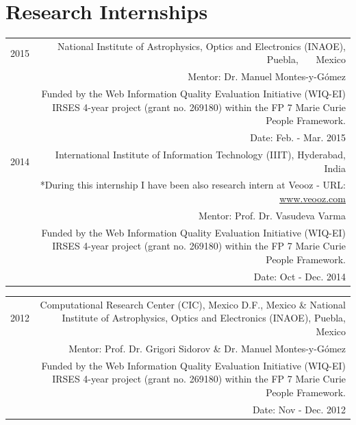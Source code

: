 \documentclass[10pt]{article}
\begin{document}
\section*{Research Internships}
\begin{tabular}{L!{\VRule}R}
	2015&National Institute of Astrophysics, Optics and Electronics (INAOE), Puebla, ~~~Mexico\\
	&\scriptsize{Mentor: Dr. Manuel Montes-y-G{\'o}mez}\\          
	&\scriptsize{Funded by the  Web Information Quality Evaluation Initiative (WIQ-EI) IRSES 4-year project (grant no. 269180) within the FP 7 Marie Curie People Framework.}\\
	&\scriptsize{Date: Feb. - Mar. 2015}\vspace{5pt}\\
	2014&International Institute of Information Technology (IIIT), Hyderabad, India\\
	&\scriptsize{*During this internship I have been also research intern at Veooz - URL: \url{www.veooz.com} }\\
	&\scriptsize{Mentor: Prof. Dr. Vasudeva Varma}\\          
	&\scriptsize{Funded by the  Web Information Quality Evaluation Initiative (WIQ-EI) IRSES 4-year project (grant no. 269180) within the FP 7 Marie Curie People Framework.}\\
	&\scriptsize{Date: Oct - Dec. 2014}\vspace{5pt}\\
\end{tabular}

\begin{tabular}{L!{\VRule}R}
	2012&Computational Research Center (CIC), Mexico D.F., Mexico \& National Institute of Astrophysics, Optics and Electronics (INAOE), Puebla, Mexico\\
	&\scriptsize{Mentor: Prof. Dr. Grigori Sidorov \& Dr. Manuel Montes-y-G{\'o}mez}\\         
	&\scriptsize{Funded by the  Web Information Quality Evaluation Initiative (WIQ-EI) IRSES 4-year project (grant no. 269180) within the FP 7 Marie Curie People Framework.}\\
	&\scriptsize{Date: Nov - Dec. 2012}\vspace{5pt}\\
\end{tabular}
\end{document}
